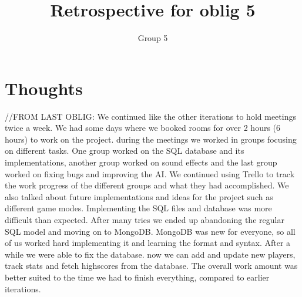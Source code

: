 \documentclass{article}
\title{Retrospective for oblig 5}
\author{Group 5}
\date{}
\begin{document}
    \maketitle

    \section{Thoughts}
    \noindent












    //FROM LAST OBLIG:
     We continued like the other iterations to hold meetings twice a week. We had some days where we booked rooms for over 2 hours (6 hours) to work on the project.
     during the meetings we worked in groups focusing on different tasks. One group worked on the SQL database and its implementations, another group worked on sound effects
     and the last group worked on fixing bugs and improving the AI. We continued using Trello to track the work progress of the different groups and what they had accomplished.
     We also talked about future implementations and ideas for the project such as different game modes.
     Implementing the SQL files and database was more difficult than expected.
     After many tries we ended up abandoning the regular SQL model and moving on to MongoDB. MongoDB was new for everyone, so all of us worked hard
     implementing it and learning the format and syntax. After a while we were able to fix the database. now we can add and update new players, track
     stats and fetch highscores from the database. The overall work amount was better suited to the time we had to finish everything, compared to earlier iterations.
\end{document}
